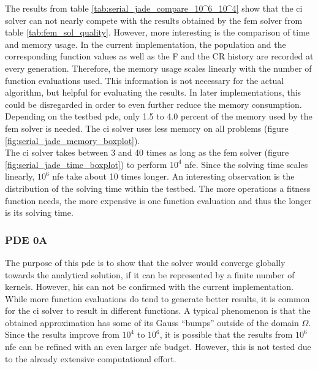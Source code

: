 \documentclass[./\jobname.tex]{subfiles}
\begin{document}
The results from table \ref{tab:serial_jade_compare_10^6_10^4} show that the \gls{ci} solver can not nearly compete with the results obtained by the \gls{fem} solver from table \ref{tab:fem_sol_quality}. However, more interesting is the comparison of time and memory usage. In the current implementation, the population and the corresponding function values as well as the F and the CR history are recorded at every generation. Therefore, the memory usage scales linearly with the number of function evaluations used. This information is not necessary for the actual algorithm, but helpful for evaluating the results. In later implementations, this could be disregarded in order to even further reduce the memory consumption. Depending on the testbed \gls{pde}, only 1.5 to 4.0 percent of the memory used by the \gls{fem} solver is needed. The \gls{ci} solver uses less memory on all problems (figure \ref{fig:serial_jade_memory_boxplot}). \\
The \gls{ci} solver takes between 3 and 40 times as long as the \gls{fem} solver (figure \ref{fig:serial_jade_time_boxplot}) to perform $10^4$ \gls{nfe}. Since the solving time scales linearly, $10^6$ \gls{nfe} take about 10 times longer. An interesting observation is the distribution of the solving time within the testbed. The more operations a fitness function needs, the more expensive is one function evaluation and thus the longer is its solving time. 

\subsubsection{PDE 0A}
\label{chap: experiment_0_pde_0A}
The purpose of this \gls{pde} is to show that the solver would converge globally towards the analytical solution, if it can be represented by a finite number of kernels. However, his can not be confirmed with the current implementation. While more function evaluations do tend to generate better results, it is common for the \gls{ci} solver to result in different functions. A typical phenomenon is that the obtained approximation has some of its Gauss ``bumps'' outside of the domain $\Omega$. Since the results improve from $10^4$ to $10^6$, it is possible that the results from $10^6$ \gls{nfe} can be refined with an even larger \gls{nfe} budget. However, this is not tested due to the already extensive computational effort. 
\end{document}
